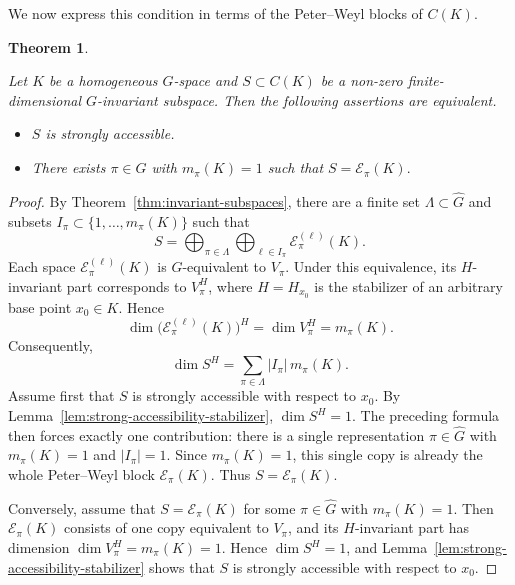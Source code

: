 \documentclass[11pt,showkeys]{amsart}
\newtheorem{theorem}{Theorem}[section]
\begin{document}
We now express this condition in terms of the Peter--Weyl blocks of
\(C(K)\).

\begin{theorem}
\label{thm:strong-accessibility}

Let \(K\) be a homogeneous \(G\)-space and  \(S\subset C(K)\) be a non-zero finite-dimensional \(G\)-invariant
subspace. Then the following assertions are equivalent.
\begin{itemize}
\item[(1)] \(S\) is strongly accessible. \item[(2)] There exists \(\pi\in\widehat G\) with \(m_\pi(K)=1\) such that
\(
        S=\mathcal E_\pi(K).
\)
\end{itemize}
\end{theorem}

\begin{proof}
By Theorem~\ref{thm:invariant-subspaces}, there are a finite set
\(\Lambda\subset\widehat G\) and subsets
\(I_\pi\subset\{1,\ldots,m_\pi(K)\}\) such that
\[
        S
        =
        \bigoplus_{\pi\in\Lambda}
        \bigoplus_{\ell\in I_\pi}
        \mathcal E_\pi^{(\ell)}(K).
\]
Each space \(\mathcal E_\pi^{(\ell)}(K)\) is \(G\)-equivalent to \(V_\pi\).
Under this equivalence, its \(H\)-invariant part corresponds to
\(V_\pi^H\), where \(H=H_{x_0}\) is the stabilizer of an arbitrary
base point \(x_0\in K\).
 Hence
\[
        \dim \bigl(\mathcal E_\pi^{(\ell)}(K)\bigr)^H
        =
        \dim V_\pi^H
        =
        m_\pi(K).
\]
Consequently,
\[
        \dim S^H
        =
        \sum_{\pi\in\Lambda}
        |I_\pi|\,m_\pi(K).
\]
Assume first that \(S\) is strongly accessible with respect to \(x_0\).
By Lemma~\ref{lem:strong-accessibility-stabilizer}, \(\dim S^H=1\).
The preceding formula then forces exactly one contribution: there is a
single representation \(\pi\in\widehat G\) with \(m_\pi(K)=1\) and
\(|I_\pi|=1\). Since \(m_\pi(K)=1\), this single copy is already the
whole Peter--Weyl block \(\mathcal E_\pi(K)\). Thus
\(
        S=\mathcal E_\pi(K).
\)



Conversely, assume that \(S=\mathcal E_\pi(K)\) for some
\(\pi\in\widehat G\) with \(m_\pi(K)=1\). Then \(\mathcal{E}_\pi(K)\) consists of
one copy equivalent to \(V_\pi\), and its \(H\)-invariant part has
dimension
\(
        \dim V_\pi^H=m_\pi(K)=1.
\)
Hence \(\dim S^H=1\), and
Lemma~\ref{lem:strong-accessibility-stabilizer} shows that \(S\) is
strongly accessible with respect to \(x_0\).
\end{proof}
\end{document}
